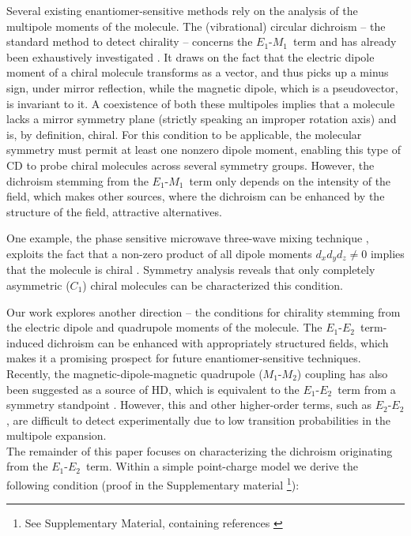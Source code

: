 \documentclass[reprint,aps,prl,twocolumn,superscriptaddress,groupedaddress]{revtex4-2}
\newcommand{\eomo}{$E_1$-$M_1$}
\newcommand{\eoet}{$E_1$-$E_2$}
\newcommand{\etet}{$E_2$-$E_2$}
\begin{document}

Several existing enantiomer-sensitive methods rely on the analysis of the multipole moments of the molecule. The (vibrational) circular dichroism -- the standard method to detect chirality -- concerns the \eomo~term and has already been exhaustively investigated \cite{Stephens1985,BUCKINGHAM1987,Mun2019,Lovesey2019}. It draws on the fact that the electric dipole moment of a chiral molecule transforms as a vector, and thus picks up a minus sign, under mirror reflection, while the magnetic dipole, which is a pseudovector, is invariant to it. A coexistence of both these multipoles implies that a molecule lacks a mirror symmetry plane (strictly speaking an improper rotation axis) and is, by definition, chiral. For this condition to be applicable, the molecular symmetry must permit at least one nonzero dipole moment, enabling this type of CD to probe chiral molecules across several symmetry groups. However, the dichroism stemming from the \eomo ~term only depends on the intensity of the field, 
which makes other sources, where the dichroism can be enhanced by the structure of the field, attractive alternatives.

One example, the phase sensitive microwave three-wave mixing technique \cite{Patterson2013,Patterson2013PRL}, exploits the fact that a non-zero product of all dipole moments $d_xd_yd_z\neq 0$ implies that the molecule is chiral \cite{Patterson2013,Ordonez2018,Ayuso2022}. Symmetry analysis reveals that only completely asymmetric ($C_1$) chiral molecules can be characterized this condition.

Our work explores another direction -- the conditions for chirality stemming from the electric dipole and quadrupole moments of the molecule. The \eoet~term-induced dichroism can be enhanced with appropriately structured fields, which makes it a promising prospect for future enantiomer-sensitive techniques. Recently, the magnetic-dipole-magnetic quadrupole ($M_1$-$M_2$) coupling has also been suggested as a source of HD, which is equivalent to the \eoet~term from a symmetry standpoint \cite{Ji2024}. However, this and other higher-order terms, such as \etet, are difficult to detect experimentally due to low transition probabilities in the multipole expansion.\\

The remainder of this paper focuses on characterizing the dichroism originating from the \eoet ~term. Within a simple point-charge model we derive the following condition (proof in the Supplementary material \footnote{See Supplementary Material, containing references \cite{Maslov2024,Maslov_Thesis,Lax1975,Bliokh2015,Bliokh2023}}):\\
\end{document}
